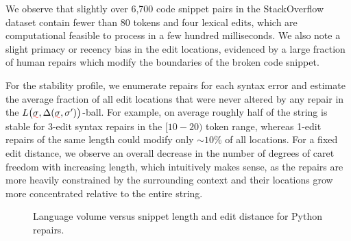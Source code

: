 \documentclass[sigplan,review,acmsmall,nonacm,screen,anonymous]{acmart}\settopmatter{printfolios=false,printccs=false,printacmref=false}
\begin{document}
We observe that slightly over 6,700 code snippet pairs in the StackOverflow dataset contain fewer than 80 tokens and four lexical edits, which are computational feasible to process in a few hundred milliseconds. We also note a slight primacy or recency bias in the edit locations, evidenced by a large fraction of human repairs which modify the boundaries of the broken code snippet.

For the stability profile, we enumerate repairs for each syntax error and estimate the average fraction of all edit locations that were never altered by any repair in the $L\big(\err\sigma, \Delta(\err\sigma, \sigma')\big)$-ball. For example, on average roughly half of the string is stable for 3-edit syntax repairs in the $[10-20)$ token range, whereas 1-edit repairs of the same length could modify only $\sim 10\%$ of all locations. For a fixed edit distance, we observe an overall decrease in the number of degrees of caret freedom with increasing length, which intuitively makes sense, as the repairs are more heavily constrained by the surrounding context and their locations grow more concentrated relative to the entire string.

\begin{figure}
\vspace{-0.4cm}
\resizebox{.45\textwidth}{!}{}
\vspace{-0.8cm}
\caption{Language volume versus snippet length and edit distance for Python repairs.}
\label{fig:volumetric_plot}
\vspace{-0.2cm}
\end{figure}
\end{document}
